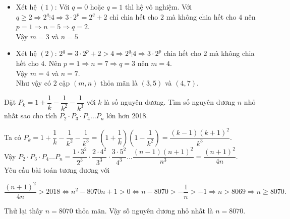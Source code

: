 \begin{ex}
{\begin{enumerate}
			\begin{itemize}
				\item Xét hệ $(1)$: Với $q=0$ hoặc $q=1$ thì hệ vô nghiệm. Với $q\ge 2\Rightarrow 2^q\vdots 4\Rightarrow 3\cdot 2^p=2^q+2$ chỉ chia hết cho $2$ mà không chia hết cho $4$ nên $p=1\Rightarrow n=5\Rightarrow q=2$.\\
				Vậy $m=3$ và $n=5$
				\item Xét hệ $(2)$: $2^q=3\cdot 2^p+2> 4\Rightarrow 2^q\vdots 4\Rightarrow 3\cdot 2^p$ chia hết cho $2$ mà không chia hết cho $4$. Nên $p=1\Rightarrow n=7\Rightarrow q=3$ nên $m=4$.\\
				Vậy $m=4$ và $n=7$.\\
				Như vậy có $2$ cặp $(m,n)$ thỏa mãn là $(3,5)$ và $(4,7)$.
			\end{itemize}
		\end{enumerate}
	}
\end{ex}
\begin{ex}%
	Đặt $P_k=1+\dfrac{1}{k}-\dfrac{1}{k^2}-\dfrac{1}{k^3}$ với $k$ là số nguyên dương. Tìm số nguyên dương $n$ nhỏ nhất sao cho tích $P_2\cdot P_3\cdot P_4\ldots P_n$ lớn hơn 2018.
	\loigiai
	{
		Ta có $P_k=1+\dfrac{1}{k}-\dfrac{1}{k^2}-\dfrac{1}{k^3}=\left(1+\dfrac{1}{k}\right)\left(1-\dfrac{1}{k^2}\right)=\dfrac{(k-1)(k+1)^2}{k^3}$.\\
		Vậy $P_2\cdot P_3\cdot P_4\ldots P_n=\dfrac{1\cdot 3^2}{2^3}\cdot \dfrac{2\cdot 4^2}{3^3}\cdot \dfrac{3\cdot 5^2}{4^3}\ldots \dfrac{(n-1)(n+1)^2}{n^3}=\dfrac{(n+1)^2}{4n}$.\\
		Yêu cầu bài toán tương đương với
		\begin{center}
			$\dfrac{(n+1)^2}{4n}>2018\Leftrightarrow n^2-8070n+1>0\Leftrightarrow n-8070>-\dfrac{1}{n}>-1\Rightarrow n>8069\Rightarrow n\ge 8070.$
		\end{center}
		Thử lại thấy $n=8070$ thỏa mãn. Vậy số nguyên dương nhỏ nhất là $n=8070$.
	}
\end{ex}
